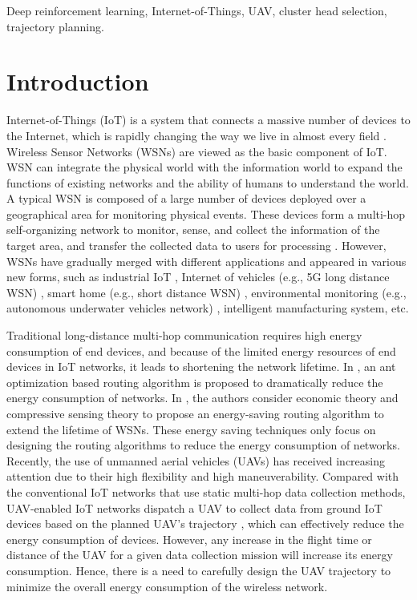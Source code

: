\documentclass[journal]{IEEEtran}
\begin{document}
	\begin{IEEEkeywords}
	Deep reinforcement learning, Internet-of-Things, UAV, cluster head selection, trajectory planning.
	\end{IEEEkeywords}
	
	
	\section{Introduction}
	\label{sec:introduction}
	  Internet-of-Things (IoT) is a system that connects a massive number of devices to the Internet, which is rapidly changing the way we live in almost every field \cite{S. Chen}. Wireless Sensor Networks (WSNs) are viewed as the basic component of IoT. WSN can integrate the physical world with the information world to expand the functions of existing networks and the ability of humans to understand the world. A typical WSN is composed of a large number of devices deployed over a geographical area for monitoring physical events. These devices form a multi-hop self-organizing network to monitor, sense, and collect the information of the target area, and transfer the collected data to users for processing \cite{H. Xie}. However, WSNs have gradually merged with different applications and appeared in various new forms, such as industrial IoT \cite{K. R. Choo}, Internet of vehicles (e.g., 5G long distance WSN) \cite{Q. Zhang}, smart home (e.g., short distance WSN) \cite{C. Tseng}, environmental monitoring (e.g., autonomous underwater vehicles network) \cite{D. Wei et al}, intelligent manufacturing system, etc.
	
	
	 Traditional long-distance multi-hop communication requires high energy consumption of end devices, and because of the limited energy resources of end devices in IoT networks, it leads to shortening the network lifetime. In \cite{Y. Kim}, an ant optimization based routing algorithm is proposed to dramatically reduce the energy consumption of networks. In \cite{D. Lin}, the authors consider economic theory and compressive sensing theory to propose an energy-saving routing algorithm to extend the lifetime of WSNs. These energy saving techniques only focus on designing the routing algorithms to reduce the energy consumption of networks. Recently, the use of unmanned aerial vehicles (UAVs) has received increasing attention due to their high flexibility and high maneuverability. Compared with the conventional IoT networks that use static multi-hop data collection methods, UAV-enabled IoT networks dispatch a UAV to collect data from ground IoT devices based on the planned UAV's trajectory \cite{M. Samir}, which can effectively reduce the energy consumption of devices. {However, any increase in the flight time or distance of the UAV for a given data collection mission will increase its energy consumption. Hence, there is a need to carefully design the UAV trajectory to minimize the overall energy consumption of the wireless network.}
	
\end{document}
